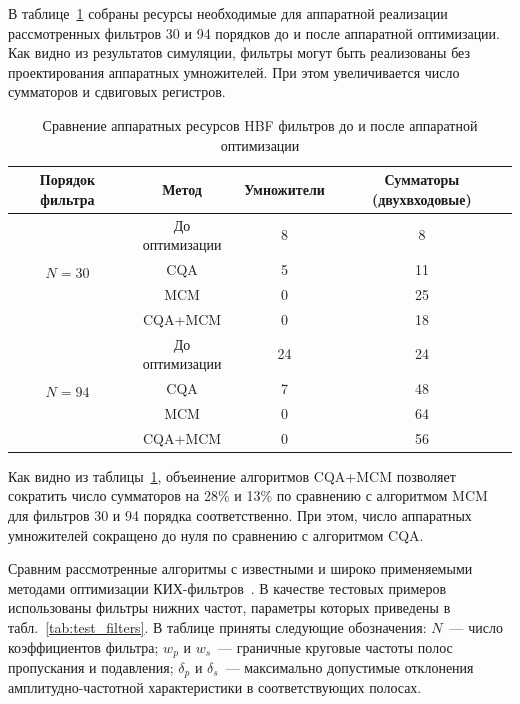 В таблице~\ref{tab:cqa_mcm_comparison} собраны ресурсы необходимые для аппаратной реализации рассмотренных фильтров 30 и 94 порядков до и после аппаратной оптимизации. Как видно из результатов симуляции, фильтры могут быть реализованы без проектирования аппаратных умножителей. При этом увеличивается число сумматоров и сдвиговых регистров.
\begin{table}[htbp]
	\centering
	\caption{Сравнение аппаратных ресурсов HBF фильтров до и после аппаратной оптимизации}
	\label{tab:cqa_mcm_comparison}
	
	\begin{tabular}{|c|c|c|c|}
		\hline
		Порядок фильтра & Метод & Умножители & Сумматоры (двухвходовые) \\
		\hline
		
		\multirow{4}{*}{$N = 30$}
		& До оптимизации & 8 & 8 \\
		& CQA            & 5 & 11 \\
		& MCM            & 0 & 25 \\
		& CQA+MCM        & 0 & 18 \\
		\hline
		
		\multirow{4}{*}{$N = 94$}
		& До оптимизации & 24 & 24 \\
		& CQA            & 7  & 48 \\
		& MCM            & 0  & 64 \\
		& CQA+MCM        & 0  & 56 \\
		\hline
		
	\end{tabular}
\end{table}

Как видно из таблицы~\ref{tab:cqa_mcm_comparison}, объеинение алгоритмов CQA+MCM позволяет сократить число сумматоров на 28\% и 13\% по сравнению с алгоритмом MCM для фильтров 30 и 94 порядка соответственно. При этом, число аппаратных умножителей сокращено до нуля по сравнению с алгоритмом CQA.

Сравним рассмотренные алгоритмы с известными и широко применяемыми методами оптимизации КИХ-фильтров~\cite{Aksoy2014, Kumm2023, Xu2007, Shi2011, Yu2010}. В качестве тестовых примеров использованы фильтры нижних частот, параметры которых приведены в табл.~\ref{tab:test_filters}. В таблице приняты следующие обозначения: $N$~--- число коэффициентов фильтра; $w_p$ и $w_s$~--- граничные круговые частоты полос пропускания и подавления; $\delta_p$ и $\delta_s$~--- максимально допустимые отклонения амплитудно-частотной характеристики в соответствующих полосах.

